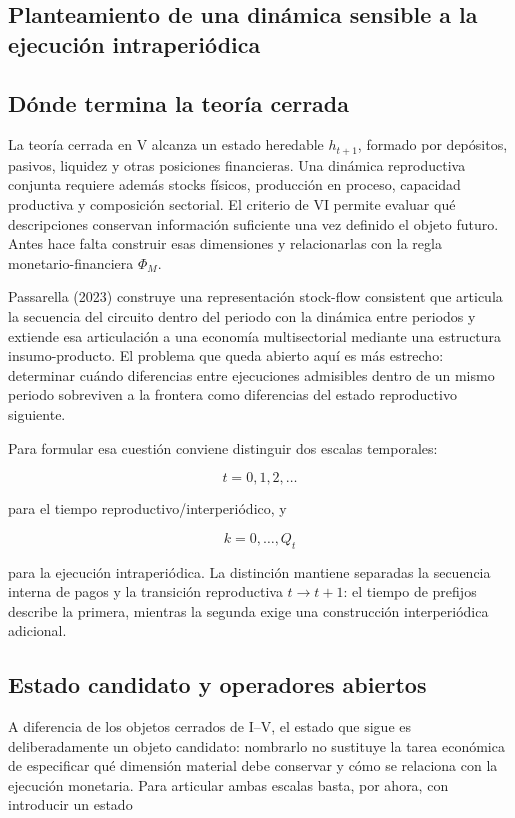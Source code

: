 \documentclass[10pt,a5paper,twoside]{article}
\begin{document}
\subsection*{Planteamiento de una dinámica sensible a la ejecución intraperiódica}\label{planteamiento-de-una-dinuxe1mica-de-dos-tiempos}

\subsection{Dónde termina la teoría cerrada}\label{duxf3nde-termina-la-teoruxeda-cerrada}

La teoría cerrada en V alcanza un estado heredable \(h_{t+1}\), formado
por depósitos, pasivos, liquidez y otras posiciones financieras. Una
dinámica reproductiva conjunta requiere además stocks físicos, producción
en proceso, capacidad productiva y composición sectorial. El criterio de VI permite evaluar qué descripciones conservan información
suficiente una vez definido el objeto futuro. Antes hace falta construir esas
dimensiones y relacionarlas con la regla monetario-financiera \(\Phi_M\).

Passarella (2023) construye una representación stock-flow consistent que
articula la secuencia del circuito dentro del periodo con la dinámica entre
periodos y extiende esa articulación a una economía multisectorial mediante
una estructura insumo-producto. El problema que queda abierto aquí es más
estrecho: determinar cuándo diferencias entre ejecuciones admisibles dentro
de un mismo periodo sobreviven a la frontera como diferencias del estado
reproductivo siguiente.

Para formular esa cuestión conviene distinguir dos escalas temporales:

\[
t=0,1,2,\ldots
\]

para el tiempo reproductivo/interperiódico, y

\[
k=0,\ldots,Q_t
\]

para la ejecución intraperiódica. La distinción mantiene separadas la
secuencia interna de pagos y la transición reproductiva \(t\to t+1\): el
tiempo de prefijos describe la primera, mientras la segunda exige una
construcción interperiódica adicional.

\subsection{Estado candidato y operadores abiertos}\label{estado-candidato-y-operadores-abiertos}

A diferencia de los objetos cerrados de I--V, el estado que sigue es deliberadamente
un objeto candidato: nombrarlo no sustituye la tarea económica de especificar qué
dimensión material debe conservar y cómo se relaciona con la ejecución monetaria.
Para articular ambas escalas basta, por ahora, con introducir un estado
\end{document}
